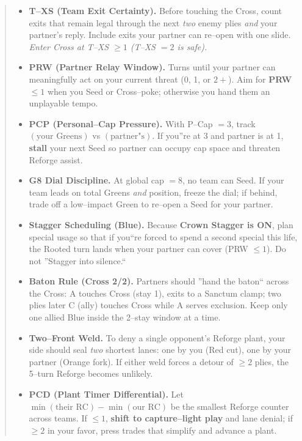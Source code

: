 \documentclass[11pt]{article}
\begin{document}
\begin{quote}
\begin{itemize}[leftmargin=1.3em,itemsep=0.3em]
  \item \textbf{T--XS (Team Exit Certainty).}
  Before touching the Cross, count exits that remain legal through the next \emph{two} enemy plies \emph{and} your partner's reply. Include exits your partner can re--open with one slide. \emph{Enter Cross at T--XS $\ge 1$ (T--XS $=2$ is safe).}

  \item \textbf{PRW (Partner Relay Window).}
  Turns until your partner can meaningfully act on your current threat (0, 1, or $2+$). Aim for \textbf{PRW $\le 1$} when you Seed or Cross--poke; otherwise you hand them an unplayable tempo.

  \item \textbf{PCP (Personal--Cap Pressure).}
  With P--Cap $=3$, track $(\text{your Greens})$ vs $(\text{partner"s})$. If you''re at 3 and partner is at 1, \textbf{stall} your next Seed so partner can occupy cap space and threaten Reforge assist.

  \item \textbf{G8 Dial Discipline.}
  At global cap $=8$, no team can Seed. If your team leads on total Greens \emph{and} position, freeze the dial; if behind, trade off a low--impact Green to re--open a Seed for your partner.

  \item \textbf{Stagger Scheduling (Blue).}
  Because \textbf{Crown Stagger is ON}, plan special usage so that if you``re forced to spend a second special this life, the Rooted turn lands when your partner can cover (PRW $\le 1$). Do not ''Stagger into silence.``

  \item \textbf{Baton Rule (Cross 2/2).}
  Partners should ''hand the baton`` across the Cross: A touches Cross (stay 1), exits to a Sanctum clamp; two plies later C (ally) touches Cross while A serves exclusion. Keep only one allied Blue inside the 2--stay window at a time.

  \item \textbf{Two--Front Weld.}
  To deny a single opponent's Reforge plant, your side should seal \emph{two} shortest lanes: one by you (Red cut), one by your partner (Orange fork). If either weld forces a detour of $\ge 2$ plies, the 5--turn Reforge becomes unlikely.

  \item \textbf{PCD (Plant Timer  Differential).}
  Let $\min(\text{their RC}) - \min(\text{our RC})$ be the smallest Reforge counter across teams. If $\le 1$, \textbf{shift to capture--light play} and lane denial; if $\ge 2$ in your favor, press trades that simplify and advance a plant.


\end{itemize}
\end{quote}
\end{document}

